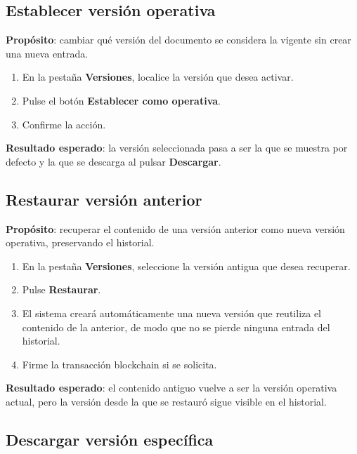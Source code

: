 \documentclass[11pt, a4paper]{article}
\begin{document}
\subsection{Establecer versi\'{o}n operativa}

\textbf{Prop\'{o}sito}: cambiar qu\'{e} versi\'{o}n del documento se considera la vigente sin crear una nueva entrada.

\begin{enumerate}
    \item En la pesta\~{n}a \textbf{Versiones}, localice la versi\'{o}n que desea activar.
    \item Pulse el bot\'{o}n \textbf{Establecer como operativa}.
    \item Confirme la acci\'{o}n.
\end{enumerate}

\textbf{Resultado esperado}: la versi\'{o}n seleccionada pasa a ser la que se muestra por defecto y la que se descarga al pulsar \textbf{Descargar}.

\subsection{Restaurar versi\'{o}n anterior}

\textbf{Prop\'{o}sito}: recuperar el contenido de una versi\'{o}n anterior como nueva versi\'{o}n operativa, preservando el historial.

\begin{enumerate}
    \item En la pesta\~{n}a \textbf{Versiones}, seleccione la versi\'{o}n antigua que desea recuperar.
    \item Pulse \textbf{Restaurar}.
    \item El sistema crear\'{a} autom\'{a}ticamente una nueva versi\'{o}n que reutiliza el contenido de la anterior, de modo que no se pierde ninguna entrada del historial.
    \item Firme la transacci\'{o}n blockchain si se solicita.
\end{enumerate}

\textbf{Resultado esperado}: el contenido antiguo vuelve a ser la versi\'{o}n operativa actual, pero la versi\'{o}n desde la que se restaur\'{o} sigue visible en el historial.

\subsection{Descargar versi\'{o}n espec\'{i}fica}
\end{document}
